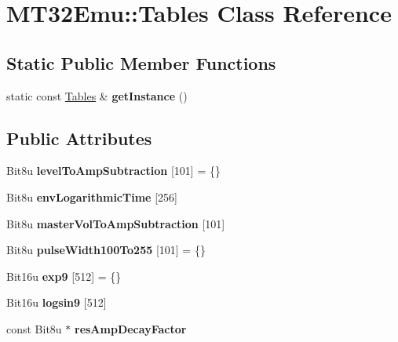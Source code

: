 \hypertarget{classMT32Emu_1_1Tables}{\section{M\-T32\-Emu\-:\-:Tables Class Reference}
\label{classMT32Emu_1_1Tables}
}
\subsection*{Static Public Member Functions}
\begin{DoxyCompactItemize}
\item 
\hypertarget{classMT32Emu_1_1Tables_a92557d129127ce714b333dce71c74cb9}{static const \hyperlink{classMT32Emu_1_1Tables}{Tables} \& {\bfseries get\-Instance} ()}\label{classMT32Emu_1_1Tables_a92557d129127ce714b333dce71c74cb9}

\end{DoxyCompactItemize}
\subsection*{Public Attributes}
\begin{DoxyCompactItemize}
\item 
\hypertarget{classMT32Emu_1_1Tables_a4a7167e3c556703bead810994b032688}{Bit8u {\bfseries level\-To\-Amp\-Subtraction} \mbox{[}101\mbox{]} = \{\}}\label{classMT32Emu_1_1Tables_a4a7167e3c556703bead810994b032688}

\item 
\hypertarget{classMT32Emu_1_1Tables_a48bd2926c8d20384abedb4592204bd2c}{Bit8u {\bfseries env\-Logarithmic\-Time} \mbox{[}256\mbox{]}}\label{classMT32Emu_1_1Tables_a48bd2926c8d20384abedb4592204bd2c}

\item 
\hypertarget{classMT32Emu_1_1Tables_a3052d321c8366975b674bf4b45f36787}{Bit8u {\bfseries master\-Vol\-To\-Amp\-Subtraction} \mbox{[}101\mbox{]}}\label{classMT32Emu_1_1Tables_a3052d321c8366975b674bf4b45f36787}

\item 
\hypertarget{classMT32Emu_1_1Tables_acd94250bdab13fb6e62ec3dbb092902a}{Bit8u {\bfseries pulse\-Width100\-To255} \mbox{[}101\mbox{]} = \{\}}\label{classMT32Emu_1_1Tables_acd94250bdab13fb6e62ec3dbb092902a}

\item 
\hypertarget{classMT32Emu_1_1Tables_ab9a55daaf9d1d665fb15b79277cfaa3b}{Bit16u {\bfseries exp9} \mbox{[}512\mbox{]} = \{\}}\label{classMT32Emu_1_1Tables_ab9a55daaf9d1d665fb15b79277cfaa3b}

\item 
\hypertarget{classMT32Emu_1_1Tables_a0c005314e0c77a3b66bab69806d7746b}{Bit16u {\bfseries logsin9} \mbox{[}512\mbox{]}}\label{classMT32Emu_1_1Tables_a0c005314e0c77a3b66bab69806d7746b}

\item 
\hypertarget{classMT32Emu_1_1Tables_aa932cb17342df3a0e106368f8d8b715c}{const Bit8u $\ast$ {\bfseries res\-Amp\-Decay\-Factor}}\label{classMT32Emu_1_1Tables_aa932cb17342df3a0e106368f8d8b715c}

\end{DoxyCompactItemize}


